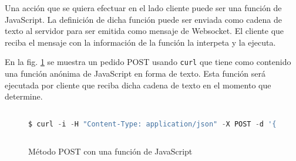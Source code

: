 		Una acción que se quiera efectuar en el lado cliente puede ser una función de JavaScript. La definición de dicha función puede ser enviada como cadena de texto al servidor para ser emitida como mensaje de Websocket. El cliente que reciba el mensaje con la información de la función la interpeta y la ejecuta. 

		En la fig. \ref{fig:java_post} se muestra un pedido POST usando \texttt{curl} que tiene como contenido una función anónima de JavaScript en forma de texto. Esta función será ejecutada por cliente que reciba dicha cadena de texto en el momento que determine. 

			\begin{figure}[htb]%
				\begin{lstlisting}[language=Python]%

$ curl -i -H "Content-Type: application/json" -X POST -d '{"action":"function", "data":"var miFuncion = function(){/*Código que se quiera ejecutar*/};"}' http://beampressk.com:5000/action
  
				\end{lstlisting}
			\caption{Método POST con una función de JavaScript}
			\label{fig:java_post}
			\end{figure}		

	
